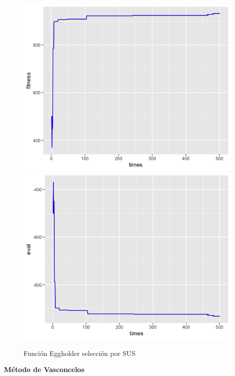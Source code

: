 \documentclass[letterpaper,12pt]{article}
\theoremstyle{definition}
\begin{document}
\begin{figure}[h!]
    \includegraphics[width=\linewidth]{egg_elite_sus_fitness_new}
  \endminipage\hfill
    \includegraphics[width=\linewidth]{egg_elite_sus_eval_new}
  \endminipage\hfill
  \caption{Función Eggholder selección por SUS}
  \label{fig:egg_sus}
\end{figure}

\textbf{Método de Vasconcelos}\\
\end{document}
